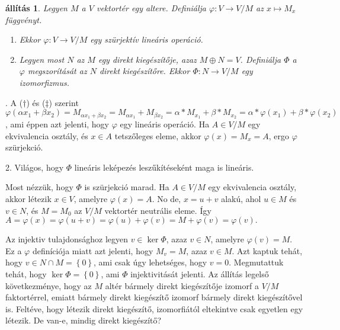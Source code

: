 \documentclass[9pt, a4paper, showtrims]{memoir}
\makeatletter
\renewenvironment{proof}[1][\proofname]
    {\par\pushQED{\qed}%
    \normalfont \topsep6\p@\@plus6\p@\relax
    \trivlist
    \item[\hskip\labelsep
        \itshape
    #1\@addpunct{:}]\ignorespaces}
    {\popQED\endtrivlist\@endpefalse}
\theoremstyle{plain}
\newtheorem{proposition}{állítás}[chapter]
\theoremstyle{remark}
\theoremstyle{definition}
\makeatother
\begin{document}
\begin{proposition}
	Legyen $M$ a $V$ vektortér egy altere.
	Definiálja $\varphi:V\to V/M$ az $x\mapsto M_x$ függvényt.
	\begin{enumerate}
		\item Ekkor $\varphi:V\to V/M$ egy szürjektív lineáris operáció.
		\item Legyen most $N$ az $M$ egy direkt kiegészítője,
		      azaz $M\oplus N=V$.
		      Definiálja $\Phi$ a $\varphi$ megszorítását az $N$ direkt kiegészítőre.
		      Ekkor $\Phi:N\to V/M$ egy izomorfizmus.\qedhere
	\end{enumerate}
\end{proposition}
\begin{proof}
	1. A ($\dag$) és ($\ddag$) szerint
	$
		\varphi\left( \alpha x_1+\beta x_2 \right)
		=
		M_{\alpha x_1+\beta x_2}
		=
		M_{\alpha x_1}+M_{\beta x_2}
		=
		\alpha\ast M_{x_1}+\beta\ast M_{x_2}
		=
		\alpha\ast\varphi\left( x_1 \right)+\beta\ast\varphi\left( x_2 \right)
	$,
	ami éppen azt jelenti, hogy $\varphi$ egy lineáris operáció.
	Ha $A\in V/M$ egy ekvivalencia osztály, és $x\in A$ tetszőleges eleme,
	akkor $\varphi\left( x \right)=M_x=A$, ergo $\varphi$ szürjekció.

	2. Világos, hogy $\Phi$ lineáris leképezés leszűkítéseként maga is lineáris.

	Most nézzük, hogy $\Phi$ is szürjekció marad.
	Ha $A\in V/M$ egy ekvivalencia osztály,
	akkor létezik $x\in V$, amelyre $\varphi\left( x \right)=A$.
	No de, $x=u+v$ alakú, ahol $u\in M$ és $v\in N$, és $M=M_0$ az $V/M$ vektortér neutrális eleme.
	Így
	$
		A=\varphi\left( x \right)=\varphi\left( u+v \right)=\varphi\left( u \right)+\varphi\left( v \right)
		=M+\varphi\left( v \right)=\varphi\left( v \right).
	$

	Az injektiv tulajdonsághoz legyen $v\in \ker\Phi$,
	azaz $v\in N$, amelyre $\varphi\left( v \right)=M$.
	Ez a $\varphi$ definíciója miatt azt jelenti, hogy $M_v=M$, azaz $v\in M$.
	Azt kaptuk tehát, hogy $v\in N\cap M=\left\{ 0 \right\}$,
	ami csak úgy lehetséges,
	hogy $v=0$.
	Megmutattuk tehát, hogy $\ker\Phi=\left\{ 0 \right\}$,
	ami $\Phi$ injektivitását jelenti.
\end{proof}
Az állítás legelső következménye,
hogy az $M$ altér bármely direkt kiegészítője izomorf a $V/M$ faktortérrel,
emiatt bármely direkt kiegészítő izomorf bármely direkt kiegészítővel is.
Feltéve, hogy
létezik direkt kiegészítő, izomorfiától eltekintve csak egyetlen egy létezik.
De van-e, mindig direkt kiegészítő?
\end{document}
